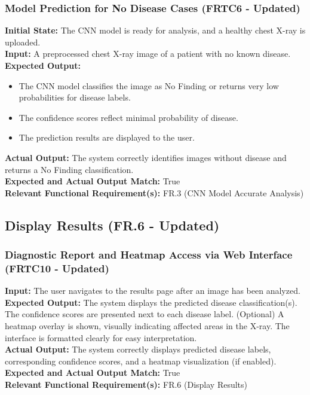 \documentclass[12pt, titlepage]{article}
\begin{document}
\subsubsection{Model Prediction for No Disease Cases (FRTC6 - Updated)}
\textbf{Initial State:} The CNN model is ready for analysis, and a healthy chest X-ray is uploaded.\\
\textbf{Input:} A preprocessed chest X-ray image of a patient with no known disease.\\
\textbf{Expected Output:}
\begin{itemize}
\item The CNN model classifies the image as No Finding or returns very low probabilities for disease labels.
\item The confidence scores reflect minimal probability of disease.
\item The prediction results are displayed to the user.
\end{itemize}
\textbf{Actual Output:} The system correctly identifies images without disease and returns a No Finding classification.\\
\textbf{Expected and Actual Output Match:} True\\
\textbf{Relevant Functional Requirement(s):} FR.3 (CNN Model Accurate Analysis)\\

\subsection{Display Results (FR.6 - Updated)}
\subsubsection{Diagnostic Report and Heatmap Access via Web Interface (FRTC10 - Updated)}
\textbf{Input:} The user navigates to the results page after an image has been analyzed.\\
\textbf{Expected Output:} The system displays the predicted disease classification(s). The confidence scores are presented next to each disease label. (Optional) A heatmap overlay is shown, visually indicating affected areas in the X-ray. The interface is formatted clearly for easy interpretation.\\
\textbf{Actual Output:} The system correctly displays predicted disease labels, corresponding confidence scores, and a heatmap visualization (if enabled).\\
\textbf{Expected and Actual Output Match:} True\\
\textbf{Relevant Functional Requirement(s):} FR.6 (Display Results)\\
\end{document}
